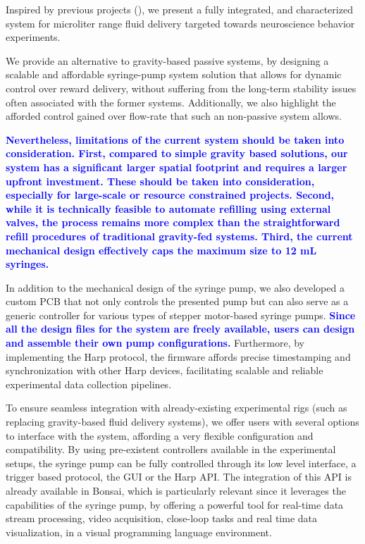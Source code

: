 Inspired by previous projects (\citep{Amarante2019, Wijnen2014}), we present a fully integrated, and characterized system for microliter range fluid delivery targeted towards neuroscience behavior experiments. 
 
We provide an alternative to gravity-based passive systems, by designing a scalable and affordable syringe-pump system solution that allows for dynamic control over reward delivery, without suffering from the long-term stability issues often associated with the former systems. Additionally, we also highlight the afforded control gained over flow-rate that such an non-passive system allows.

\textcolor{blue}{\textbf{Nevertheless, limitations of the current system should be taken into consideration. First, compared to simple gravity based solutions, our system has a significant larger spatial footprint and requires a larger upfront investment. These should be taken into consideration, especially for large-scale  or resource constrained projects. Second, while it is technically feasible to automate refilling using external valves, the process remains more complex than the straightforward refill procedures of traditional gravity-fed systems. Third, the current mechanical design effectively caps the maximum size to 12 mL syringes.}}

In addition to the mechanical design of the syringe pump, we also developed a custom PCB that not only controls the presented pump but can also serve as a generic controller for various types of stepper motor-based syringe pumps. \textcolor{blue}{\textbf{Since all the design files for the system are freely available, users can design and assemble their own pump configurations.}} Furthermore, by implementing the Harp protocol, the firmware affords precise timestamping and synchronization with other Harp devices, facilitating scalable and reliable experimental data collection pipelines.

To ensure seamless integration with already-existing experimental rigs (such as replacing gravity-based fluid delivery systems), we offer users with several options to interface with the system, affording a very flexible configuration and compatibility. By using pre-existent controllers available in the experimental setups, the syringe pump can be fully controlled through its low level interface, a trigger based protocol, the GUI or the Harp API. The integration of this API is already available in Bonsai, which is particularly relevant since it leverages the capabilities of the syringe pump, by offering a powerful tool for real-time data stream processing, video acquisition, close-loop tasks and real time data visualization, in a visual programming language environment. 

